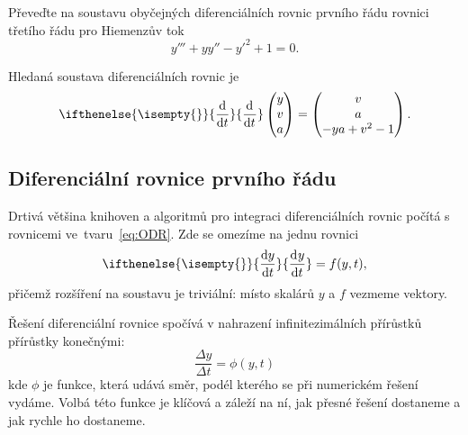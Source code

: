 \documentclass[a4paper,11pt,twoside]{article}
\renewcommand{\d}{\mathrm{d}}
\newcommand{\derivative}[3][]{\ifthenelse{\isempty{#1}}	    %
	{\frac{\d{#2}}{\d{#3}}}
	{\frac{\d^{#1}{#2}}{\d{#3}^{#1}}}
}
\def\makematrix#1{\begin{pmatrix}#1\end{pmatrix}}       %
\begin{document}
\begin{task}
    Převeďte na soustavu obyčejných diferenciálních rovnic prvního řádu rovnici třetího řádu pro Hiemenzův tok
    \begin{equation}
        y'''+yy''-y'^{2}+1=0.
    \end{equation}
\end{task}

\begin{solution}
    Hledaná soustava diferenciálních rovnic je
    \begin{equation}
        \derivative{}{t}\makematrix{y \\ v \\ a}=\makematrix{v \\ a \\ -ya+v^{2}-1}.
    \end{equation}
\end{solution}

\subsection{Diferenciální rovnice prvního řádu}
    Drtivá většina knihoven a algoritmů pro integraci diferenciálních rovnic počítá s rovnicemi ve~tvaru~\eqref{eq:ODR}.
    Zde se omezíme na jednu rovnici
    \begin{equation}
        \derivative{y}{t}=f(y,t),
    \end{equation}
    přičemž rozšíření na soustavu je triviální: místo skalárů $y$ a $f$ vezmeme vektory.

    Řešení diferenciální rovnice spočívá v nahrazení infinitezimálních přírůstků přírůstky konečnými:
    \begin{equation}\label{eq:Difference}
        \frac{\Delta y}{\Delta t}=\phi(y,t)
    \end{equation}
    kde $\phi$ je funkce, která udává směr, podél kterého se při numerickém řešení vydáme.
    Volbá této funkce je klíčová a záleží na ní, jak přesné řešení dostaneme a jak rychle ho dostaneme.
\end{document}
